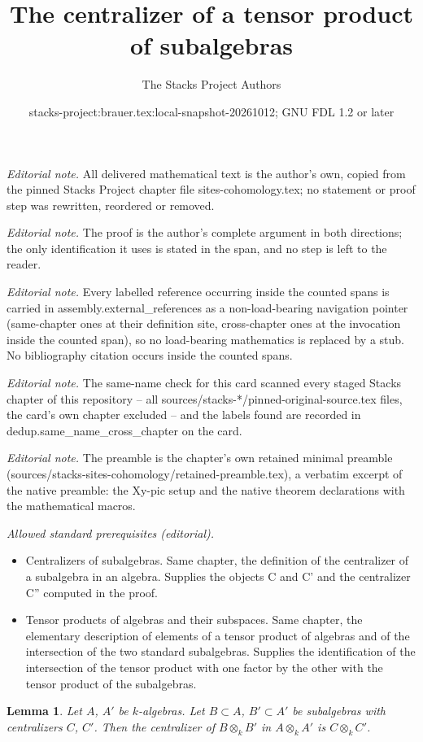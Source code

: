 \documentclass[10pt,a4paper]{amsart}
\title{The centralizer of a tensor product of subalgebras}
\author{The Stacks Project Authors}
\date{stacks-project:brauer.tex:local-snapshot-20261012; GNU FDL 1.2 or later}
\theoremstyle{plain}
\newtheorem{lemma}[subsection]{Lemma}
\theoremstyle{definition}
\theoremstyle{remark}
\numberwithin{equation}{subsection}
\begin{document}
\maketitle
\noindent\textit{Editorial note.} All delivered mathematical text is the author's own, copied from the pinned Stacks Project chapter file sites-cohomology.tex; no statement or proof step was rewritten, reordered or removed.\par\medskip
\noindent\textit{Editorial note.} The proof is the author's complete argument in both directions; the only identification it uses is stated in the span, and no step is left to the reader.\par\medskip
\noindent\textit{Editorial note.} Every labelled reference occurring inside the counted spans is carried in assembly.external\_references as a non-load-bearing navigation pointer (same-chapter ones at their definition site, cross-chapter ones at the invocation inside the counted span), so no load-bearing mathematics is replaced by a stub. No bibliography citation occurs inside the counted spans.\par\medskip
\noindent\textit{Editorial note.} The same-name check for this card scanned every staged Stacks chapter of this repository -- all sources/stacks-*/pinned-original-source.tex files, the card's own chapter excluded -- and the labels found are recorded in dedup.same\_name\_cross\_chapter on the card.\par\medskip
\noindent\textit{Editorial note.} The preamble is the chapter's own retained minimal preamble (sources/stacks-sites-cohomology/retained-preamble.tex), a verbatim excerpt of the native preamble: the Xy-pic setup and the native theorem declarations with the mathematical macros.\par\medskip
\noindent\textit{Allowed standard prerequisites (editorial).}\begin{itemize}
\item Centralizers of subalgebras. Same chapter, the definition of the centralizer of a subalgebra in an algebra. Supplies the objects C and C' and the centralizer C'' computed in the proof.
\item Tensor products of algebras and their subspaces. Same chapter, the elementary description of elements of a tensor product of algebras and of the intersection of the two standard subalgebras. Supplies the identification of the intersection of the tensor product with one factor by the other with the tensor product of the subalgebras.
\end{itemize}\medskip
\begin{lemma}
\label{lemma-centralizer}
Let $A$, $A'$ be $k$-algebras. Let $B \subset A$, $B' \subset A'$ be
subalgebras with centralizers $C$, $C'$. Then the centralizer of
$B \otimes_k B'$ in $A \otimes_k A'$ is $C \otimes_k C'$.
\end{lemma}
\end{document}
